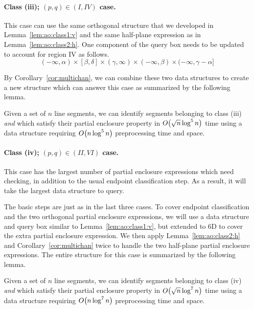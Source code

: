 \paragraph{Class (iii); $(p, q) \in (I, IV)$ case.} 
This case can use the same orthogonal structure that we developed in Lemma~\ref{lem:ao:class1:v} and the same half-plane expression as in Lemma~\ref{lem:ao:class2:h}. 
One component of the query box needs to be updated to account for region IV as follows.
\[
(-\infty, \alpha) \times [\beta, \delta] \times (\gamma, \infty) \times (-\infty, \beta) \times (-\infty, \gamma - \alpha]
\]

By Corollary~\ref{cor:multichan}, we can combine these two data structures to create a new structure which can answer this case as summarized by the following lemma.

\begin{lemma}
\label{lem:ao:class3:c}
Given a set of $n$ line segments, we can identify segments belonging to class (iii) \emph{and} which satisfy their partial enclosure property in $O\!\left(\sqrt{n}\log^5{n}\right)$ time using a data structure requiring $O\!\left(n\log^5{n}\right)$ preprocessing time and space.
\end{lemma}


\paragraph{Class (iv); $(p, q) \in (II, VI)$ case.} 
This case has the largest number of partial enclosure expressions which need checking, in addition to the usual endpoint classification step. 
As a result, it will take the largest data structure to query.

The basic steps are just as in the last three cases. 
To cover endpoint classification and the two orthogonal partial enclosure expressions, we will use a data structure and query box similar to Lemma~\ref{lem:ao:class1:v}, but extended to 6D to cover the extra partial enclosure expression.
We then apply Lemma~\ref{lem:ao:class2:h} and Corollary~\ref{cor:multichan} twice to handle the two half-plane partial enclosure expressions. 
The entire structure for this case is summarized by the following lemma.

\begin{lemma}
\label{lem:ao:class4:c}
Given a set of $n$ line segments, we can identify segments belonging to class (iv) \emph{and} which satisfy their partial enclosure property in $O\!\left(\sqrt{n}\log^7{n}\right)$ time using a data structure requiring $O\!\left(n\log^7{n}\right)$ preprocessing time and space.
\end{lemma}


